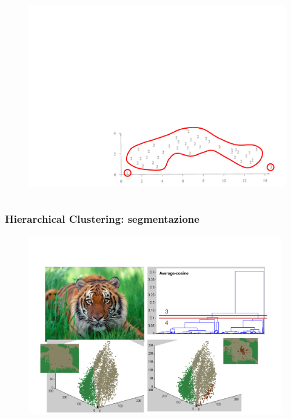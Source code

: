 \begin{frame}
\begin{columns}
			\begin{figure}[!htbp]
				\centering
				\includegraphics[angle=0,width=1\linewidth]{images/unsupervised/hierarchical/hierarchical_single_link_drawback_2.pdf}
			\end{figure}

		\end{columns}



\end{frame}


\begin{frame}

	\frametitle{{\color{GradientDescentDiagramGreen}Hierarchical Clustering}: segmentazione}

		\begin{figure}[!htbp]
			\centering
			\includegraphics[width=11.0cm]{images/unsupervised/hierarchical/hc_avg_cosine_1.pdf}
		\end{figure}


\end{frame}


